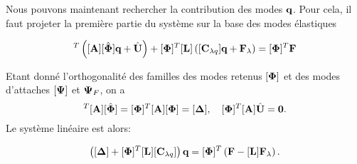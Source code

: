 \documentclass[10pt,a4paper,french]{report}
\begin{document}
Nous pouvons maintenant rechercher la contribution des modes $\textbf{q}$. Pour cela, il faut projeter la première partie du système  sur la base des modes élastiques



\begin{equation}
	[\bs{\Phi}]^T\left( [\tb{A}][\hat{\bs{\Phi}}] \tb{q}+ \hat{\tb{U}}\right)+[\bs{\Phi}]^T[\tb{L}]\left(
	[\tb{C}_{\lambda q}]\tb{q}+\tb{F}_\lambda
	\right)=[\bs{\Phi}]^T\tb{F}
\end{equation}

Etant donné l'orthogonalité des familles des modes retenus $[\boldsymbol{\Phi}]$ et des modes d'attaches $[\boldsymbol{\Psi}]$ et $\boldsymbol{\Psi}_F$, on a 
\begin{equation}
	[\bs{\Phi}]^T [\tb{A}][\hat{\bs{\Phi}}]=[\bs{\Phi}]^T [\tb{A}][\bs{\Phi}]=[\bs{\Delta}] \esp 
	[\bs{\Phi}]^T [\tb{A}]\hat{\tb{U}}=\tb{0}.
\end{equation}
Le système linéaire est alors:

\begin{equation}
\left([\boldsymbol{\Delta}] +[\boldsymbol{\Phi}]^T[\textbf{L}][\textbf{C}_{\lambda q}] \right)\textbf{q}=[\boldsymbol{\Phi}]^T\left(\textbf{F}-
[\textbf{L}]\textbf{F}_{\lambda}\right).
\end{equation}
\end{document}
